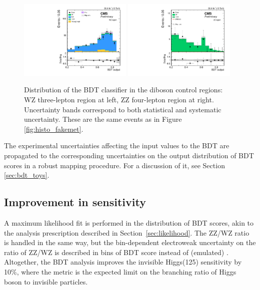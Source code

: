 \begin{figure}[htbp]
\begin{center}
\includegraphics[width=0.48\textwidth]{figures/fullsel_bdt_wz_postfit.pdf}
\includegraphics[width=0.48\textwidth]{figures/fullsel_bdt_zz_postfit.pdf}
\caption{Distribution of the BDT classifier in the diboson control regions: WZ three-lepton region at left, ZZ four-lepton region at right. Uncertainty bands correspond to both statistical and systematic uncertainty. 
These are the same events as in Figure \ref{fig:histo_fakemet}.}
\label{fig:bdt_vv}
\end{center}
\end{figure}
\clearpage

The experimental uncertainties affecting the input values to the BDT are propagated to
the corresponding uncertainties on the output distribution of BDT scores in a robust mapping procedure.
For a discussion of it, see Section \ref{sec:bdt_toys}.

\subsection{Improvement in sensitivity} 
A maximum likelihood fit is performed in the distribution of BDT scores, akin to the \met analysis prescription described in Section~\ref{sec:likelihood}.
The ZZ/WZ ratio is handled in the same way, but the bin-dependent electroweak uncertainty on the ratio of ZZ/WZ
is described in bins of BDT score instead of (emulated) \met.
Altogether, the BDT analysis improves the invisible Higgs(125) sensitivity by 10\%,
where the metric is the expected limit on the branching ratio of Higgs boson to invisible particles.

